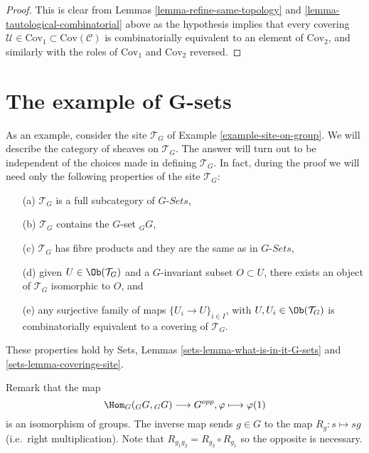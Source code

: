 \begin{proof}
This is clear from Lemmas \ref{lemma-refine-same-topology}
and \ref{lemma-tautological-combinatorial} above as the hypothesis
implies that every covering
$\mathcal{U} \in \text{Cov}_1 \subset \text{Cov}(\mathcal{C})$
is combinatorially equivalent to an element of $\text{Cov}_2$,
and similarly with the roles of $\text{Cov}_1$ and $\text{Cov}_2$
reversed.
\end{proof}
















\section{The example of G-sets}
\label{section-example-sheaf-G-sets}

\noindent
As an example, consider the site $\mathcal{T}_G$ of
Example \ref{example-site-on-group}. We will describe the
category of sheaves on $\mathcal{T}_G$. The answer will turn
out to be independent of the choices made in defining $\mathcal{T}_G$.
In fact, during the proof we will need only the following
properties of the site $\mathcal{T}_G$:
\begin{enumerate}
\item[(a)] $\mathcal{T}_G$ is a full subcategory of $G\textit{-Sets}$,
\item[(b)] $\mathcal{T}_G$ contains the $G$-set ${}_GG$,
\item[(c)] $\mathcal{T}_G$ has fibre products and they are the same as
in $G\textit{-Sets}$,
\item[(d)] given $U \in \Ob(\mathcal{T}_G)$ and a $G$-invariant
subset $O \subset U$, there exists an object of $\mathcal{T}_G$ isomorphic
to $O$, and
\item[(e)] any surjective family of maps $\{U_i \to U\}_{i \in I}$, with
$U, U_i \in \Ob(\mathcal{T}_G)$ is combinatorially equivalent to a
covering of $\mathcal{T}_G$.
\end{enumerate}
These properties hold by Sets, Lemmas \ref{sets-lemma-what-is-in-it-G-sets}
and \ref{sets-lemma-coverings-site}.

\medskip\noindent
Remark that the map
$$
\Hom_G({}_GG, {}_GG)
\longrightarrow
G^{opp},
\varphi
\longmapsto
\varphi(1)
$$
is an isomorphism of groups. The inverse map sends $g \in G$
to the map $R_g : s \mapsto sg$ (i.e.\ right multiplication).
Note that $R_{g_1g_2} = R_{g_2} \circ R_{g_1}$ so the opposite
is necessary.

